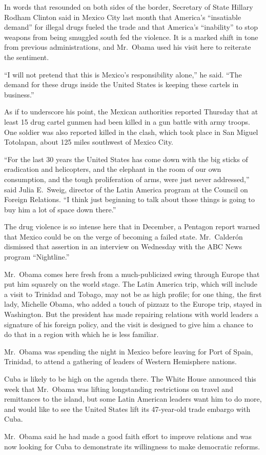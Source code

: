 \documentclass[12pt,a4paper,onecolumn]{article}
\begin{document}
In words that resounded on both sides of the border, Secretary of State Hillary Rodham Clinton said
in Mexico City last month that America's ``insatiable demand'' for illegal drugs fueled the trade
and that America's ``inability'' to stop weapons from being smuggled south fed the violence. It is a
marked shift in tone from previous administrations, and Mr.~Obama used his visit here to reiterate
the sentiment.

``I will not pretend that this is Mexico's responsibility alone,'' he said. ``The demand for these
drugs inside the United States is keeping these cartels in business.''

As if to underscore his point, the Mexican authorities reported Thursday that at least 15 drug
cartel gunmen had been killed in a gun battle with army troops. One soldier was also reported killed
in the clash, which took place in San Miguel Totolapan, about 125 miles southwest of Mexico City.

``For the last 30 years the United States has come down with the big sticks of eradication and
helicopters, and the elephant in the room of our own consumption, and the tough proliferation of
arms, were just never addressed,'' said Julia E.~Sweig, director of the Latin America program at the
Council on Foreign Relations. ``I think just beginning to talk about those things is going to buy
him a lot of space down there.''

The drug violence is so intense here that in December, a Pentagon report warned that Mexico could be
on the verge of becoming a failed state. Mr.~Calderón dismissed that assertion in an interview on
Wednesday with the ABC News program ``Nightline.''

Mr.~Obama comes here fresh from a much-publicized swing through Europe that put him squarely on the
world stage. The Latin America trip, which will include a visit to Trinidad and Tobago, may not be
as high profile; for one thing, the first lady, Michelle Obama, who added a touch of pizzazz to the
Europe trip, stayed in Washington. But the president has made repairing relations with world leaders
a signature of his foreign policy, and the visit is designed to give him a chance to do that in a
region with which he is less familiar.

Mr.~Obama was spending the night in Mexico before leaving for Port of Spain, Trinidad, to attend a
gathering of leaders of Western Hemisphere nations.

Cuba is likely to be high on the agenda there. The White House announced this week that Mr.~Obama
was lifting longstanding restrictions on travel and remittances to the island, but some Latin
American leaders want him to do more, and would like to see the United States lift its 47-year-old
trade embargo with Cuba.

Mr.~Obama said he had made a good faith effort to improve relations and was now looking for Cuba to
demonstrate its willingness to make democratic reforms.

\pagebreak
\printindex
\end{document}
